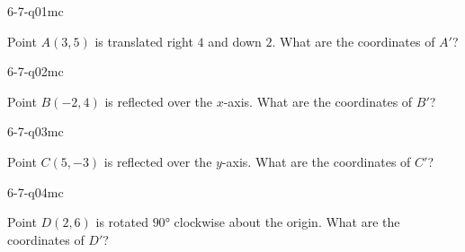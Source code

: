 

\begin{practiceQuestion}{6-7-q01}{mc}
\begin{questionText}
Point $A(3, 5)$ is translated right $4$ and down $2$. What are the coordinates of $A'$?
\end{questionText}
\end{practiceQuestion}

\begin{practiceQuestion}{6-7-q02}{mc}
\begin{questionText}
Point $B(-2, 4)$ is reflected over the $x$-axis. What are the coordinates of $B'$?
\end{questionText}
\end{practiceQuestion}

\begin{practiceQuestion}{6-7-q03}{mc}
\begin{questionText}
Point $C(5, -3)$ is reflected over the $y$-axis. What are the coordinates of $C'$?
\end{questionText}
\end{practiceQuestion}

\begin{practiceQuestion}{6-7-q04}{mc}
\begin{questionText}
Point $D(2, 6)$ is rotated $90°$ clockwise about the origin. What are the coordinates of $D'$?
\end{questionText}
\end{practiceQuestion}

